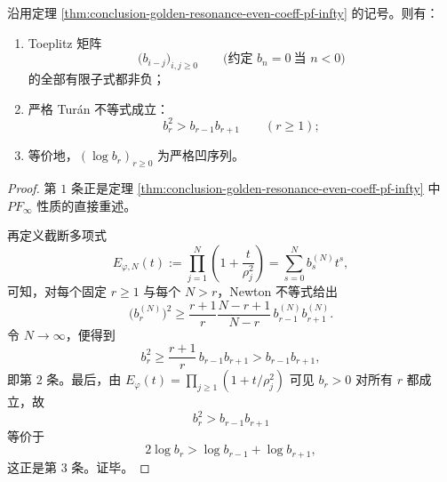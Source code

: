 \begin{corollary}\label{cor:conclusion-golden-resonance-even-coeff-turan-polya}
沿用定理 \ref{thm:conclusion-golden-resonance-even-coeff-pf-infty} 的记号。则有：
\begin{enumerate}
  \item Toeplitz 矩阵
  \[
  \bigl(b_{i-j}\bigr)_{i,j\ge 0}
  \qquad\bigl(\text{约定 }b_n=0\ \text{当 }n<0\bigr)
  \]
  的全部有限子式都非负；
  \item 严格 Tur\'an 不等式成立：
  \[
  b_r^2>b_{r-1}b_{r+1}
  \qquad (r\ge 1);
  \]
  \item 等价地，\((\log b_r)_{r\ge 0}\) 为严格凹序列。
\end{enumerate}
\end{corollary}
\begin{proof}
第 \(1\) 条正是定理 \ref{thm:conclusion-golden-resonance-even-coeff-pf-infty} 中 \(PF_\infty\) 性质的直接重述。

再定义截断多项式
\[
E_{\varphi,N}(t)
:=
\prod_{j=1}^{N}\left(1+\frac{t}{\rho_j^2}\right)
=
\sum_{s=0}^{N}b_s^{(N)}t^s,
\]
可知，对每个固定 \(r\ge 1\) 与每个 \(N>r\)，Newton 不等式给出
\[
\bigl(b_r^{(N)}\bigr)^2
\ge
\frac{r+1}{r}\frac{N-r+1}{N-r}\,
b_{r-1}^{(N)}b_{r+1}^{(N)}.
\]
令 \(N\to\infty\)，便得到
\[
b_r^2
\ge
\frac{r+1}{r}\,b_{r-1}b_{r+1}
>
b_{r-1}b_{r+1},
\]
即第 \(2\) 条。最后，由 \(E_\varphi(t)=\prod_{j\ge 1}(1+t/\rho_j^2)\) 可见 \(b_r>0\) 对所有 \(r\) 都成立，故
\[
b_r^2>b_{r-1}b_{r+1}
\]
等价于
\[
2\log b_r>\log b_{r-1}+\log b_{r+1},
\]
这正是第 \(3\) 条。证毕。
\end{proof}

